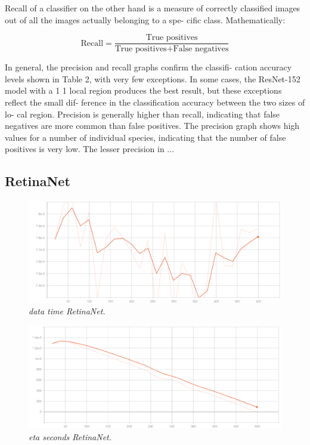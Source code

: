 Recall of a classifier on the other hand is a measure of correctly classified images out of all the images actually belonging to a spe- cific class. Mathematically:

\begin{equation}
\text{Recall} = \frac{\text{True positives}}{\text{True positives} + \text{False negatives}}
\end{equation}

In general, the precision and recall graphs confirm the classifi- cation accuracy levels shown in Table 2, with very few exceptions. In some cases, the ResNet-152 model with a 1 1 local region produces the best result, but these exceptions reflect the small dif- ference in the classification accuracy between the two sizes of lo- cal region. Precision is generally higher than recall, indicating that false negatives are more common than false positives. The precision graph shows high values for a number of individual species, indicating that the number of false positives is very low. The lesser precision in ...

\subsection{RetinaNet}

\begin{figure}[h!]
\begin{center} 
\includegraphics[scale=0.35]{figures/data_time_retinanet_1}
\caption{\small \sl data time RetinaNet. \label{fig:data_time_retinanet}}
\end{center}
\end{figure}

\begin{figure}[h!]
\begin{center} 
\includegraphics[scale=0.35]{figures/eta_seconds_retinanet_2}
\caption{\small \sl eta seconds RetinaNet. \label{fig:eta_seconds_retinanet}}
\end{center}
\end{figure}

